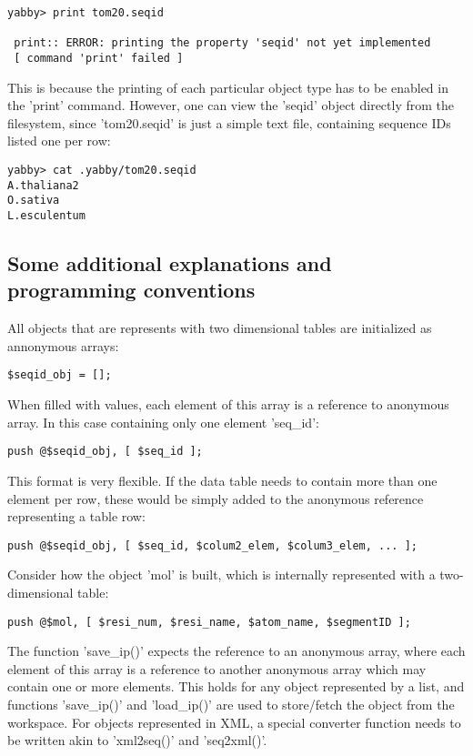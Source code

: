 \begin{verbatim}
yabby> print tom20.seqid

 print:: ERROR: printing the property 'seqid' not yet implemented
 [ command 'print' failed ]
\end{verbatim}

This is because the printing of each particular object type has to
be enabled in the 'print' command. However, one can view the 'seqid'
object directly from the filesystem, since 'tom20.seqid' is just
a simple text file, containing sequence IDs listed one per row:

\begin{verbatim}
yabby> cat .yabby/tom20.seqid
A.thaliana2
O.sativa
L.esculentum
\end{verbatim}

\subsection{Some additional explanations and programming conventions}

All objects that are represents with two dimensional tables are
initialized as annonymous arrays:

\begin{verbatim}
$seqid_obj = [];
\end{verbatim}

When filled with values, each element of this array is a reference
to anonymous array. In this case containing only one element 'seq\_id':

\begin{verbatim}
push @$seqid_obj, [ $seq_id ];
\end{verbatim}

This format is very flexible.  If the data table needs to contain more
than one element per row, these would be simply added to the anonymous
reference representing a table row:

\begin{verbatim}
push @$seqid_obj, [ $seq_id, $colum2_elem, $colum3_elem, ... ];
\end{verbatim}

Consider how the object 'mol' is built, which is internally represented
with a two-dimensional table:

\begin{verbatim}
push @$mol, [ $resi_num, $resi_name, $atom_name, $segmentID ];
\end{verbatim}

The function 'save\_ip()' expects the reference to an anonymous array,
where each element of this array is a reference to another anonymous
array which may contain one or more elements. This holds for any
object represented by a list, and functions 'save\_ip()' and
'load\_ip()' are used to store/fetch the object from the workspace.
For objects represented in XML, a special converter function needs
to be written akin to 'xml2seq()' and 'seq2xml()'.
